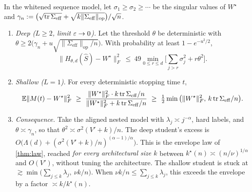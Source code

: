 \begin{theorem}\label{thm:depth}
\Mo\Ck In the whitened sequence model, let $\sigma_1\ge\sigma_2\ge\cdots$ be the singular values of $W^\star$ and
$\gamma_n:=\big(\sqrt{\operatorname{tr}\Sigma_{\mathrm{eff}}}+\sqrt{k\|\Sigma_{\mathrm{eff}}\|_{\mathrm{op}}}\big)/\sqrt n$.
\begin{enumerate}[label=(\alph*),nosep,leftmargin=*]
\item \emph{Deep ($L\ge2$, limit $\varepsilon\to0$).} Let the threshold $\theta$ be deterministic with
$\theta\ge2\big(\gamma_n+u\sqrt{\|\Sigma_{\mathrm{eff}}\|_{\mathrm{op}}/n}\big)$. With probability at least $1-e^{-u^2/2}$,
\[
\|H_{\theta,d}(\hat S)-W^\star\|_F^2\ \le\ 49\min_{0\le r\le d}\Big[\sum_{j>r}\sigma_j^2+r\theta^2\Big].
\]
\item \emph{Shallow ($L=1$).} For every deterministic stopping time $t$,
\[
\E\|M(t)-W^\star\|_F^2\ \ge\ \frac{\|W^\star\|_F^2\cdot k\tr\Sigma_{\mathrm{eff}}/n}{\|W^\star\|_F^2+k\tr\Sigma_{\mathrm{eff}}/n}\ \ge\ \tfrac12\min\big(\|W^\star\|_F^2,\,k\tr\Sigma_{\mathrm{eff}}/n\big).
\]
\item \emph{Consequence.} Take the aligned nested model with $\lambda_j\asymp j^{-\alpha}$, hard labels, and $\theta\asymp\gamma_n$, so that
$\theta^2\asymp\sigma^2(V'+k)/n$. The deep student's excess is $O\big(\Lambda(d)+(\sigma^2(V'+k)/n)^{(\alpha-1)/\alpha}\big)$. This is the
envelope law of \cref{thm:law}, reached \emph{for every architectural size $k$} between $k^\star(n)\asymp(n/\nu)^{1/\alpha}$ and
$O(V')$, without tuning the architecture. The shallow student is stuck at
$\gtrsim\min\big(\sum_{j\le k}\lambda_j,\ \nu k/n\big)$. When $\nu k/n\le\sum_{j\le k}\lambda_j$, this exceeds the envelope by a factor
$\asymp k/k^\star(n)$.
\end{enumerate}
\end{theorem}
